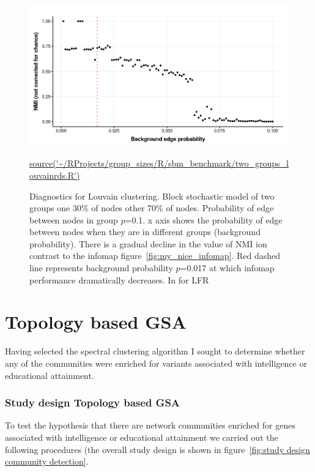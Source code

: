 \begin{figure}
    \centering
    \includegraphics[width=\textwidth]{images/chaptercommunity/ggplot2/sbm_benchmark/Rplot_NMI_louvain.png}
    \caption{Diagnostics for Louvain clustering. Block stochastic model of two groups one 30\% of nodes other 70\% of nodes. Probability of edge between nodes in group $p$=0.1. x axis shows the probability of edge between nodes when they are in different groups (background probability). There is a gradual decline in the value of NMI ion contrast to the infomap figure~\ref{fig:my_nice_infomap}. Red dashed line represents background probability $p$=0.017 at which infomap performance dramatically decreases. In \cite{yang2016comparative} for LFR}
    \tiny\url{source('~/RProjects/group_sizes/R/sbm_benchmark/two_groups_louvainrds.R')}
    \label{fig:my_sbmlouvain_nmi}
\end{figure}


\clearpage
\section{Topology based GSA}
\label{sec:Study design topology based GSA}
Having selected the spectral clustering algorithm I sought to determine whether any of the communities were enriched for variants associated with intelligence or educational attainment. 

\subsubsection{Study design Topology based GSA}
\label{sec:Study design topology based GSA}
To test the hypothesis that there are network communities enriched for genes associated with intelligence or educational attainment we carried out the following procedures (the overall study design is shown in figure~\ref{fig:study design community detection}.


